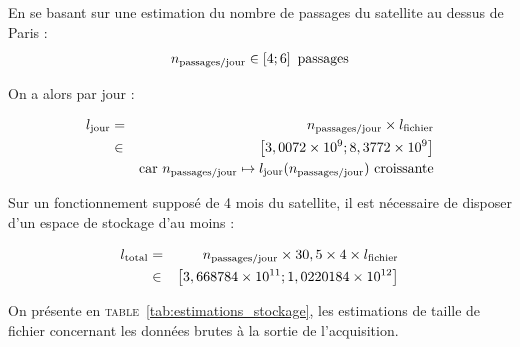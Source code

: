 \documentclass[twocolumn,pre,floats,aps,amsmath,amssymb]{revtex4}
\begin{document}
En se basant sur une estimation du nombre de passages du satellite au dessus de Paris\cite{IPGP_simul_loic} :
\begin{eqnarray}
  n_{\textup{passages/jour}} \in \left [ 4 ; 6 \right ] \ \textup{passages}
\end{eqnarray}

On a alors par jour :

\begin{eqnarray}
  l_{\textup{jour}} &=& n_{\textup{passages/jour}} \times l_{\textup{fichier}}\\
                &\in& \left [ 3,0072 \times 10^9 ; 8,3772 \times 10^9 \right ] \\
                &\ & \textup{car } n_{\textup{passages/jour}} \mapsto l_{\textup{jour}} (n_{\textup{passages/jour}}) \ \textup{croissante} \nonumber
\end{eqnarray}

Sur un fonctionnement suppos\'e de 4 mois\cite{IITB_general} du satellite, il est n\'ecessaire de disposer d'un espace de stockage d'au moins :

\begin{eqnarray}
  l_{\textup{total}} &=& n_{\textup{passages/jour}} \times 30,5 \times 4 \times l_{\textup{fichier}}\\
                 &\in& \left [ 3,668784 \times 10^{11} ; 1,0220184 \times 10^{12} \right ]
\end{eqnarray}



On pr\'esente en \textsc{table}~\ref{tab:estimations_stockage}, les estimations de taille de fichier concernant les donn\'ees brutes à la sortie de l'acquisition.
\end{document}
